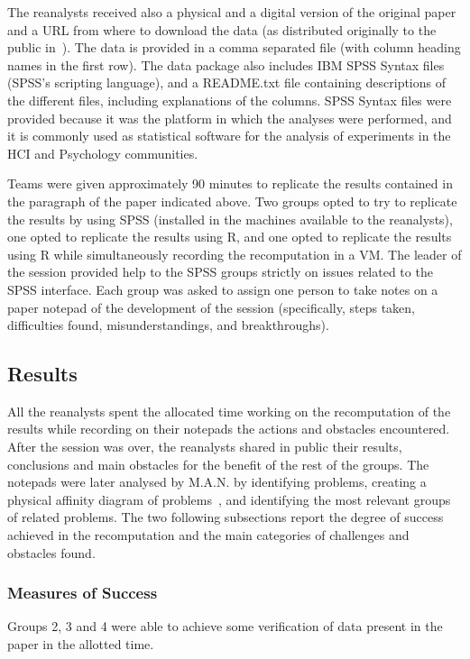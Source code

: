 The reanalysts received also a physical and a digital version of the original paper and a URL from where to download the data (as distributed originally to the public in~\cite{Nacenta:memorability_data}). The data is provided in a comma separated file (with column heading names in the first row). The data package also includes IBM SPSS Syntax files (SPSS's scripting language), and a README.txt file containing descriptions of the different files, including explanations of the columns. SPSS Syntax files were provided because it was the platform in which the analyses were performed, and it is commonly used as statistical software for the analysis of experiments in the HCI and Psychology communities. 

Teams were given approximately 90 minutes to replicate the results contained in the paragraph of the paper indicated above. Two groups opted to try to replicate the results by using SPSS (installed in the machines available to the reanalysts), one opted to replicate the results using R, and one opted to replicate the results using R while simultaneously recording the recomputation in a VM. The leader of the session provided help to the SPSS groups strictly on issues related to the SPSS interface. Each group was asked to assign one person to take notes on a paper notepad of the development of the session (specifically, steps taken, difficulties found, misunderstandings, and breakthroughs).

\subsection{Results}
All the reanalysts spent the allocated time working on the recomputation of the results while recording on their notepads the actions and obstacles encountered. After the session was over, the reanalysts shared in public their results, conclusions and main obstacles for the benefit of the rest of the groups. The notepads were later analysed by M.A.N. by identifying problems, creating a physical affinity diagram of problems~\cite{hartson:2012}, and identifying the most relevant groups of related problems. The two following subsections report the degree of success achieved in the recomputation and the main categories of challenges and obstacles found.

\subsubsection{Measures of Success}
Groups 2, 3 and 4 were able to achieve some verification of data present in the paper in the allotted time.

